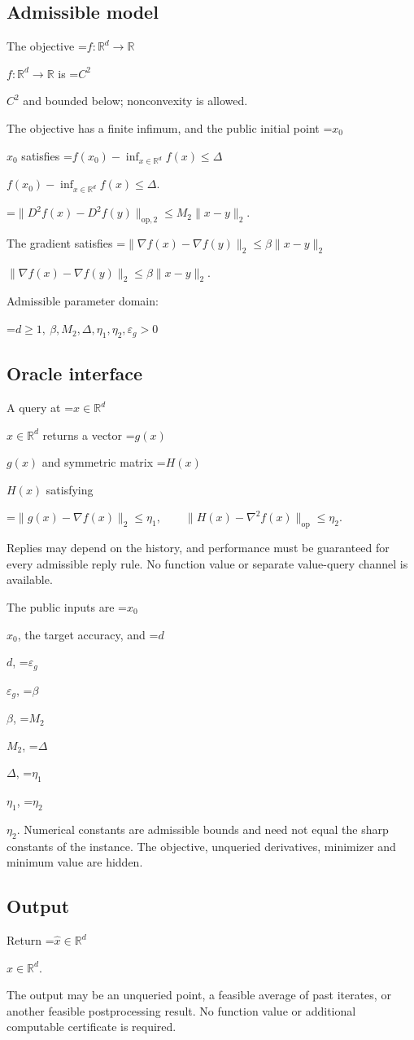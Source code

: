 \documentclass[10pt,a4paper]{article}
\newcommand{\AtlasMath}[1]{\par\begingroup\centering\setbox0=\hbox{$\displaystyle #1$}\ifdim\wd0>1.4\linewidth\typeout{ATLAS WIDE FORMULA: \the\wd0}\fi\ifdim\wd0>\linewidth\resizebox{\linewidth}{!}{\box0}\else\box0\fi\par\endgroup}
\newcommand{\AtlasInlineMath}[1]{\begingroup\setbox0=\hbox{$#1$}\ifdim\wd0>.4\linewidth\endgroup\AtlasMath{#1}\else\endgroup$#1$\fi}
\begin{document}
\subsection{Admissible model}
The objective \AtlasInlineMath{f:\mathbb{R}^d\to\mathbb{R}} is \AtlasInlineMath{C^2} and bounded below; nonconvexity is allowed.

The objective has a finite infimum, and the public initial point \AtlasInlineMath{x_0} satisfies \AtlasInlineMath{f(x_0)-\inf_{x\in \mathbb{R}^d}f(x)\le\Delta}.


\AtlasMath{\|D^{2}f(x)-D^{2}f(y)\|_{\mathrm{op},2}\le M_2\|x-y\|_{2}.}


The gradient satisfies \AtlasInlineMath{\|\nabla f(x)-\nabla f(y)\|_2\le\beta\|x-y\|_2}.

Admissible parameter domain:


\AtlasMath{d\ge1,\ \beta,M_2,\Delta,\eta_1,\eta_2,\varepsilon_g>0}


\subsection{Oracle interface}
A query at \AtlasInlineMath{x\in\mathbb{R}^d} returns a vector \AtlasInlineMath{g(x)} and symmetric matrix \AtlasInlineMath{H(x)} satisfying


\AtlasMath{\|g(x)-\nabla f(x)\|_2\le\eta_1,\qquad\|H(x)-\nabla^2f(x)\|_{\mathrm{op}}\le\eta_2.}


Replies may depend on the history, and performance must be guaranteed for every admissible reply rule. No function value or separate value-query channel is available.

The public inputs are \AtlasInlineMath{x_0}, the target accuracy, and \AtlasInlineMath{d}, \AtlasInlineMath{\varepsilon_g}, \AtlasInlineMath{\beta}, \AtlasInlineMath{M_2}, \AtlasInlineMath{\Delta}, \AtlasInlineMath{\eta_1}, \AtlasInlineMath{\eta_2}. Numerical constants are admissible bounds and need not equal the sharp constants of the instance. The objective, unqueried derivatives, minimizer and minimum value are hidden.

\subsection{Output}
Return \AtlasInlineMath{\widehat{x}\in \mathbb{R}^d}.

The output may be an unqueried point, a feasible average of past iterates, or another feasible postprocessing result. No function value or additional computable certificate is required.
\end{document}
